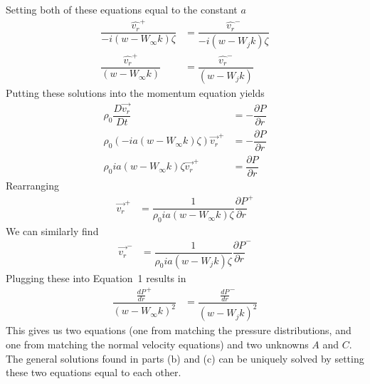 \documentclass[onecolumn,10pt]{jhwhw}
\begin{document}
Setting both of these equations equal to the constant $a$
\begin{align}
\dfrac{\hat{v_r}^+}{-i \left( w - W_{\infty} k \right) \zeta} &= \dfrac{\hat{v_r}^-}{-i \left( w - W_{j} k \right) \zeta} \nonumber \\
\dfrac{\hat{v_r}^+}{\left( w - W_{\infty} k \right)} &= \dfrac{\hat{v_r}^-}{\left( w - W_{j} k \right)}
\end{align}
Putting these solutions into the momentum equation yields
\begin{align*}
\rho_0 \dfrac{D \vec{v_r}}{D t} &= -\dfrac{\partial P}{\partial r} \\
\rho_0 \left( -i a \left( w - W_{\infty} k \right) \zeta \right) \vec{v_r}^+ &= - \dfrac{\partial P}{\partial r} \\
\rho_0 i a \left( w - W_{\infty} k \right) \zeta \vec{v_r}^+ &= \dfrac{\partial P}{\partial r}
\end{align*}
Rearranging
\begin{align*}
\vec{v_r}^+ &= \dfrac{1}{\rho_0 i a \left( w - W_{\infty} k \right) \zeta } \dfrac{\partial P}{\partial r}^+
\end{align*}
We can similarly find
\begin{align*}
\vec{v_r}^- &= \dfrac{1}{\rho_0 i a \left( w - W_{j} k \right) \zeta } \dfrac{\partial P}{\partial r}^-
\end{align*}
Plugging these into Equation~1 results in
\begin{align*}
\dfrac{\frac{dP}{dr}^+}{\left( w - W_{\infty} k \right)^2} &= \dfrac{\frac{dP}{dr}^-}{\left( w - W_{j} k \right)^2}
\end{align*}
This gives us two equations (one from matching the pressure distributions, and one from matching the normal velocity equations) and two unknowns $A$ and $C$. The general solutions found in parts (b) and (c) can be uniquely solved by setting these two equations equal to each other.
\end{document}
